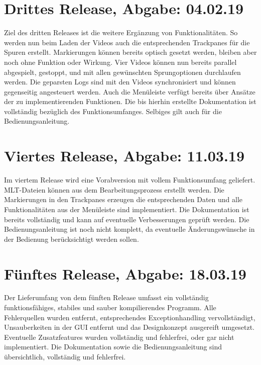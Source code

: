 \section{Drittes Release, Abgabe: 04.02.19}

Ziel des dritten Releases ist die weitere Ergänzung von Funktionalitäten.
So werden nun beim Laden der Videos auch die entsprechenden Trackpanes für die Spuren erstellt. 
Markierungen können bereits optisch gesetzt werden, bleiben aber noch ohne Funktion oder Wirkung. 
Vier Videos können nun bereits parallel abgespielt, gestoppt, und mit allen gewünschten Sprungoptionen durchlaufen werden. 
Die geparsten Logs sind mit den Videos synchronisiert und können gegenseitig angesteuert werden. 
Auch die Menüleiste verfügt bereits über Ansätze der zu implementierenden Funktionen. 
Die bis hierhin erstellte Dokumentation ist vollständig bezüglich des Funktionsumfanges. 
Selbiges gilt auch für die Bedienungsanleitung.

\section{Viertes Release, Abgabe: 11.03.19}

Im viertem Release wird eine Vorabversion mit vollem Funktionsumfang geliefert. 
MLT-Dateien können aus dem Bearbeitungsprozess erstellt werden. 
Die Markierungen in den Trackpanes erzeugen die entsprechenden Daten und alle Funktionalitäten aus der Menüleiste sind implementiert. 
Die Dokumentation ist bereits vollständig und kann auf eventuelle Verbesserungen geprüft werden. 
Die Bedienungsanleitung ist noch nicht komplett, da eventuelle Änderungswünsche in der Bedienung berücksichtigt werden sollen.

\section{Fünftes Release, Abgabe: 18.03.19}

Der Lieferumfang von dem fünften Release umfasst ein vollständig funktionsfähiges, stabiles und sauber kompilierendes Programm. 
Alle Fehlerquellen wurden entfernt, entsprechendes Exceptionhandling vervollständigt, Unsauberkeiten in der GUI entfernt und das Designkonzept ausgereift umgesetzt. 
Eventuelle Zusatzfeatures wurden vollständig und fehlerfrei, oder gar nicht implementiert. 
Die Dokumentation sowie die Bedienungsanleitung sind übersichtlich, vollständig und fehlerfrei.
